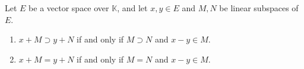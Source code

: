 Let $E$ be a vector space over $\mathbb{K}$, and let $x, y \in E$ and $M, N$ be linear subspaces of $E$.
\begin{enumerate}
\item[(i)] $x + M \supset y + N$ if and only if $M \supset N$ and $x - y \in M$.
\item[(ii)] $x + M = y + N$ if and only if $M = N$ and $x - y \in M$.
\end{enumerate}
